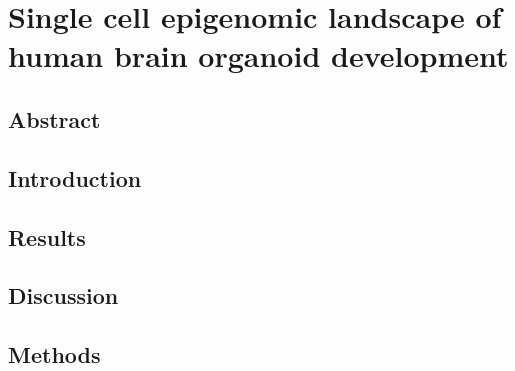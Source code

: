 \thispagestyle{plain}
\section{Single cell epigenomic landscape of human brain organoid development}


\subsection{Abstract}
\subsection{Introduction}
\subsection{Results}
\subsection{Discussion}
\subsection{Methods}



